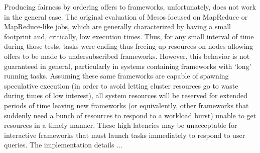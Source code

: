 Producing fairness by ordering offers to frameworks, unfortunately, does not work in the general case. The original evaluation of Mesos focused on MapReduce or MapReduce-like jobs, which are generally characterized by having a small footprint and, critically, low execution times. Thus, for any small interval of time during those tests, tasks were ending thus freeing up resources on nodes allowing offers to be made to undersubscribed frameworks. However, this behavior is not guaranteed in general, particularly in systems containing frameworks with `long' running tasks. Assuming these same frameworks are capable of spawning speculative execution (in order to avoid letting cluster resources go to waste during times of low interest), all system resources will be reserved for extended periods of time leaving new frameworks (or equivalently, other frameworks that suddenly need a bunch of resources to respond to a workload burst) unable to get resources in a timely manner. These high latencies may be unacceptable for interactive frameworks that must launch tasks immediately to respond to user queries. The implementation details ...
